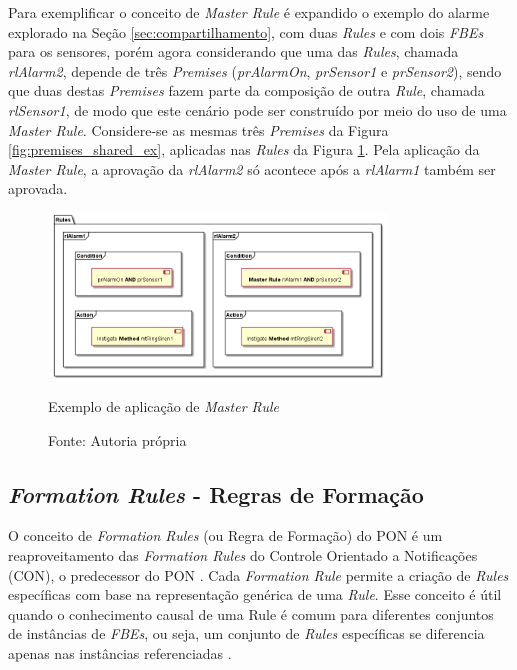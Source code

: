Para exemplificar o conceito de \textit{Master Rule} é expandido o exemplo do
alarme explorado na Seção \ref{sec:compartilhamento}, com duas \textit{Rules} e
com dois \textit{FBEs} para os sensores, porém agora considerando que uma das
\textit{Rules}, chamada \textit{rlAlarm2}, depende de três \textit{Premises}
(\textit{prAlarmOn}, \textit{prSensor1} e \textit{prSensor2}), sendo que duas
destas \textit{Premises} fazem parte da composição de outra \textit{Rule},
chamada \textit{rlSensor1}, de modo que este cenário pode ser construído por
meio do uso de uma \textit{Master Rule}. Considere-se as mesmas três
\textit{Premises} da Figura \ref{fig:premises_shared_ex}, aplicadas nas
\textit{Rules} da Figura \ref{fig:master_rule}. Pela aplicação da \textit{Master
Rule}, a aprovação da \textit{rlAlarm2} só acontece após a \textit{rlAlarm1}
também ser aprovada.

\begin{figure}[!htb]
  \centering
  \includegraphics[width=0.8\textwidth]{../out/diagrams/master_rule/rules.png}
  \smallskip
  \caption{Exemplo de aplicação de \textit{Master Rule}}
  \caption*{Fonte: Autoria própria}
  \label{fig:master_rule}
\end{figure}

\subsection{\textit{Formation Rules} - Regras de Formação}

O conceito de \textit{Formation Rules} (ou Regra de Formação) do PON é um
reaproveitamento das \textit{Formation Rules} do Controle Orientado a
Notificações (CON), o predecessor do PON \cite{msc_simao_2001}. Cada
\textit{Formation Rule} permite a criação de \textit{Rules} específicas com base
na representação genérica de uma \textit{Rule}. Esse conceito é útil quando o
conhecimento causal de uma Rule é comum para diferentes conjuntos de instâncias
de \textit{FBEs}, ou seja, um conjunto de \textit{Rules} específicas se
diferencia apenas nas instâncias referenciadas \cite{doc_ronszcka_2019}.


